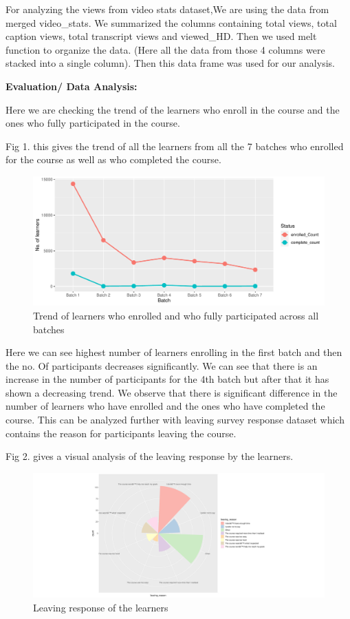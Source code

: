 \documentclass[
]{article}
\begin{document}
For analyzing the views from video stats dataset,We are using the data
from merged video\_stats. We summarized the columns containing total
views, total caption views, total transcript views and viewed\_HD. Then
we used melt function to organize the data. (Here all the data from
those 4 columns were stacked into a single column). Then this data frame
was used for our analysis.

\textbf{Evaluation/ Data Analysis:}

Here we are checking the trend of the learners who enroll in the course
and the ones who fully participated in the course.

Fig 1. this gives the trend of all the learners from all the 7 batches
who enrolled for the course as well as who completed the course.

\begin{figure}
\includegraphics[width=1\linewidth]{CSC8631-Reports_files/figure-latex/unnamed-chunk-1-1} \caption{Trend of learners who enrolled and who fully participated across all batches}\label{fig:unnamed-chunk-1}
\end{figure}

Here we can see highest number of learners enrolling in the first batch
and then the no. Of participants decreases significantly. We can see
that there is an increase in the number of participants for the 4th
batch but after that it has shown a decreasing trend. We observe that
there is significant difference in the number of learners who have
enrolled and the ones who have completed the course. This can be
analyzed further with leaving survey response dataset which contains the
reason for participants leaving the course.

Fig 2. gives a visual analysis of the leaving response by the learners.

\begin{figure}
\includegraphics[width=1\linewidth]{CSC8631-Reports_files/figure-latex/unnamed-chunk-2-1} \caption{Leaving response of the learners}\label{fig:unnamed-chunk-2}
\end{figure}
\end{document}
